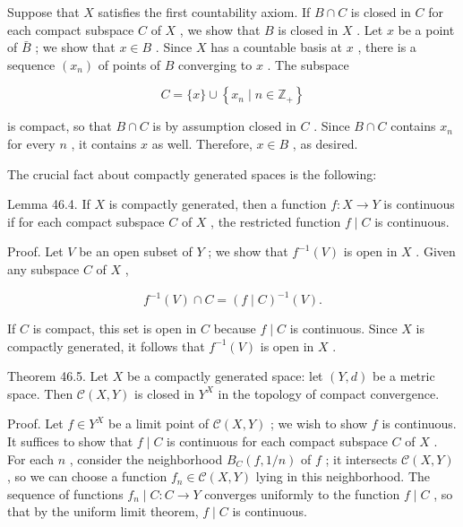 \documentclass[10pt]{article}
\begin{document}
Suppose that \(X\) satisfies the first countability axiom. If \(B \cap  C\) is closed in \(C\) for each compact subspace \(C\) of \(X\) , we show that \(B\) is closed in \(X\) . Let \(x\) be a point of \(\bar{B}\) ; we show that \(x \in  B\) . Since \(X\) has a countable basis at \(x\) , there is a sequence \(\left( {x}_{n}\right)\) of points of \(B\) converging to \(x\) . The subspace

\[
C = \{ x\}  \cup  \left\{  {{x}_{n} \mid  n \in  {\mathbb{Z}}_{ + }}\right\}
\]

is compact, so that \(B \cap  C\) is by assumption closed in \(C\) . Since \(B \cap  C\) contains \({x}_{n}\) for every \(n\) , it contains \(x\) as well. Therefore, \(x \in  B\) , as desired.

The crucial fact about compactly generated spaces is the following:

Lemma 46.4. If \(X\) is compactly generated, then a function \(f : X \rightarrow  Y\) is continuous if for each compact subspace \(C\) of \(X\) , the restricted function \(f \mid  C\) is continuous.

Proof. Let \(V\) be an open subset of \(Y\) ; we show that \({f}^{-1}\left( V\right)\) is open in \(X\) . Given any subspace \(C\) of \(X\) ,

\[
{f}^{-1}\left( V\right)  \cap  C = {\left( f \mid  C\right) }^{-1}\left( V\right) .
\]

If \(C\) is compact, this set is open in \(C\) because \(f \mid  C\) is continuous. Since \(X\) is compactly generated, it follows that \({f}^{-1}\left( V\right)\) is open in \(X\) .

Theorem 46.5. Let \(X\) be a compactly generated space: let \(\left( {Y,d}\right)\) be a metric space. Then \(\mathcal{C}\left( {X,Y}\right)\) is closed in \({Y}^{X}\) in the topology of compact convergence.

Proof. Let \(f \in  {Y}^{X}\) be a limit point of \(\mathcal{C}\left( {X,Y}\right)\) ; we wish to show \(f\) is continuous. It suffices to show that \(f \mid  C\) is continuous for each compact subspace \(C\) of \(X\) . For each \(n\) , consider the neighborhood \({B}_{C}\left( {f,1/n}\right)\) of \(f\) ; it intersects \(\mathcal{C}\left( {X,Y}\right)\) , so we can choose a function \({f}_{n} \in  \mathcal{C}\left( {X,Y}\right)\) lying in this neighborhood. The sequence of functions \({f}_{n} \mid  C : C \rightarrow  Y\) converges uniformly to the function \(f \mid  C\) , so that by the uniform limit theorem, \(f \mid  C\) is continuous.
\end{document}
